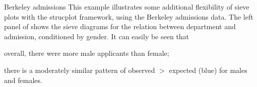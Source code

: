 \documentclass[11pt]{book}
\renewenvironment{knitrout}{\small\renewcommand{\baselinestretch}{.85}}{} %
\begin{document}
\begin{Example}[berkeley3]{Berkeley admissions}
This example illustrates some additional flexibility of sieve plots
with the strucplot framework, using the Berkeley admissions data.
The left panel of  shows the sieve diagrams for
the relation between department and admission, conditioned by gender.
It can easily be seen that 
\begin{seriate}
  \item overall, there were more male applicants than female;
  \item there is a moderately similar pattern of observed $>$ expected (blue)
  for males and females.
\end{seriate}
\begin{knitrout}
\color{fgcolor}\begin{kframe}
\begin{alltt}
 \hlstd{=}\hlstd{,} \hlstd{=}\hlstd{)}
 \hlkwb{<-}  \hlstd{(}\hlstd{,}\hlstd{,}\hlstd{))}
\hlstd{(UCB)[[}\hlstd{]]} \hlkwb{<-} \hlstd{(}\hlstd{,} \hlstd{)}   
 \hlstd{=}\hlstd{,} \hlstd{=}\hlstd{)}
\hlstd{(}   \hlstd{=} \hlstd{(} \hlstd{=} 
\end{alltt}
\end{kframe}\begin{figure}[!htbp]



\end{figure}
\end{knitrout}
\end{Example}
\end{document}
